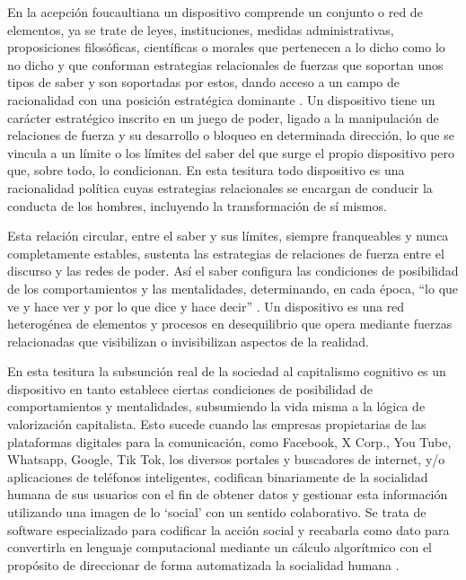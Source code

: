\documentclass[
  spanish,
  11pt,
  a4paper,
]{scrbook}
\begin{document}
En la acepción foucaultiana un dispositivo comprende un conjunto o red
de elementos, ya se trate de leyes, instituciones, medidas
administrativas, proposiciones filosóficas, científicas o morales que
pertenecen a lo dicho como lo no dicho y que conforman estrategias
relacionales de fuerzas que soportan unos tipos de saber y son
soportadas por estos, dando acceso a un campo de racionalidad con una
posición estratégica dominante \autocite[130]{Foucault1999}. Un
dispositivo tiene un carácter estratégico inscrito en un juego de poder,
ligado a la manipulación de relaciones de fuerza y su desarrollo o
bloqueo en determinada dirección, lo que se vincula a un límite o los
límites del saber del que surge el propio dispositivo pero que, sobre
todo, lo condicionan. En esta tesitura todo dispositivo es una
racionalidad política cuyas estrategias relacionales se encargan de
conducir la conducta de los hombres, incluyendo la transformación de sí
mismos.

Esta relación circular, entre el saber y sus límites, siempre
franqueables y nunca completamente estables, sustenta las estrategias de
relaciones de fuerza entre el discurso y las redes de poder. Así el
saber configura las condiciones de posibilidad de los comportamientos y
las mentalidades, determinando, en cada época, ``lo que ve y hace ver y
por lo que dice y hace decir'' \autocite[16]{Deleuze1990}. Un
dispositivo es una red heterogénea de elementos y procesos en
desequilibrio que opera mediante fuerzas relacionadas que visibilizan o
invisibilizan aspectos de la realidad.

En esta tesitura la subsunción real de la sociedad al capitalismo
cognitivo es un dispositivo en tanto establece ciertas condiciones de
posibilidad de comportamientos y mentalidades, subsumiendo la vida misma
a la lógica de valorización capitalista. Esto sucede cuando las empresas
propietarias de las plataformas digitales para la comunicación, como
Facebook, X Corp., You Tube, Whatsapp, Google, Tik Tok, los diversos
portales y buscadores de internet, y/o aplicaciones de teléfonos
inteligentes, codifican binariamente de la socialidad humana de sus
usuarios con el fin de obtener datos y gestionar esta información
utilizando una imagen de lo `social' con un sentido colaborativo. Se
trata de software especializado para codificar la acción social y
recabarla como dato para convertirla en lenguaje computacional mediante
un cálculo algorítmico con el propósito de direccionar de forma
automatizada la socialidad humana \autocite[31-55]{VanDijck2016}.
\end{document}
